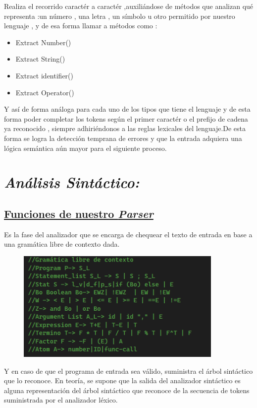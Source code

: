 \documentclass{article}%
\begin{document}
Realiza el recorrido caractér a caractér ,auxiliándose de métodos que analizan qué representa :un número , una letra , un símbolo u otro permitido por nuestro lenguaje , y de esa forma llamar a métodos como :
\begin{itemize}
    \item Extract Number()
    \item Extract String()
    \item Extract identifier()
    \item Extract Operator()
\end{itemize}

Y así de forma análoga para cada uno de los tipos que tiene el lenguaje y de esta forma poder completar los tokens según el primer caractér o el prefijo de cadena ya reconocido , siempre adhiriéndonos a las reglas lexicales del lenguaje.De esta forma se logra la detección temprana de errores y que la entrada adquiera una lógica semántica aún mayor para el siguiente proceso.  

\section{\emph{{Análisis Sintáctico:}}}
\subsection{\underline{Funciones de nuestro \emph{Parser}}}
Es la fase del analizador que se encarga de chequear el texto de entrada en base a una
gramática libre de contexto dada.
\begin{figure}[h]
 {
    \begin{center}
        {
    \includegraphics*[width=10cm]{GLC.png}
        }
    \end{center}
}
\end{figure}

 Y en caso de que el programa de entrada sea válido, suministra el árbol
sintáctico que lo reconoce.
En teoría, se supone que la salida del analizador sintáctico es alguna representación del
árbol sintáctico que reconoce de la secuencia de tokens suministrada por el analizador léxico.
\end{document}
